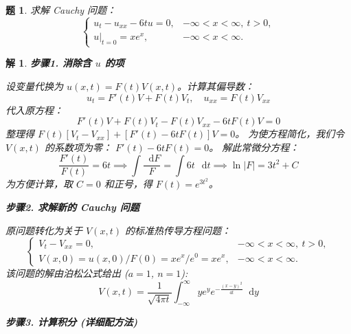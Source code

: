 \documentclass[12pt,a4paper]{article}
\newcommand{\diff}{\mathop{}\!\mathrm{d}}  %
\newtheorem{problem}{题}
\newtheorem*{solution}{解}
\begin{document}
	\hrulefill
	
\begin{problem}
	求解 Cauchy 问题：
	\[
	\begin{cases}
		u_t - u_{xx} - 6tu = 0, & -\infty < x < \infty, \ t > 0, \\
		u|_{t=0} = xe^{x}, & -\infty < x < \infty.
	\end{cases}
	\]
\end{problem}
\hrulefill
\begin{solution}
	\textbf{步骤1. 消除含 $u$ 的项}
	
	\noindent
	设变量代换为 $u(x,t) = F(t) V(x,t)$。计算其偏导数：
	\[ u_t = F'(t)V + F(t)V_t, \quad u_{xx} = F(t)V_{xx} \]
	代入原方程：
	\[ F'(t)V + F(t)V_t - F(t)V_{xx} - 6t F(t)V = 0 \]
	整理得 $F(t) [ V_t - V_{xx} ] + [ F'(t) - 6t F(t) ] V = 0$。
	为使方程简化，我们令 $V(x,t)$ 的系数项为零： $F'(t) - 6t F(t) = 0$。
	解此常微分方程：
	\[ \frac{F'(t)}{F(t)} = 6t \implies \int \frac{\diff F}{F} = \int 6t \, \diff t \implies \ln|F| = 3t^2 + C \]
	为方便计算，取 $C=0$ 和正号，得 $F(t) = e^{3t^2}$。
	
	\hrulefill
	
	\textbf{步骤2. 求解新的 Cauchy 问题}
	
	\noindent
	原问题转化为关于 $V(x,t)$ 的标准热传导方程问题：
	\[
	\begin{cases}
		V_t - V_{xx} = 0, & -\infty < x < \infty, \ t > 0, \\
		V(x,0) = u(x,0)/F(0) = xe^x/e^0 = xe^x, & -\infty < x < \infty.
	\end{cases}
	\]
	该问题的解由泊松公式给出 ($a=1$, $n=1$):
	\[ V(x,t) = \frac{1}{\sqrt{4\pi t}} \int_{-\infty}^{\infty} y e^y e^{-\frac{(x-y)^2}{4t}} \diff y \]
	
	\hrulefill
	
	\textbf{步骤3. 计算积分 (详细配方法)}
	

\end{solution}
\end{document}
